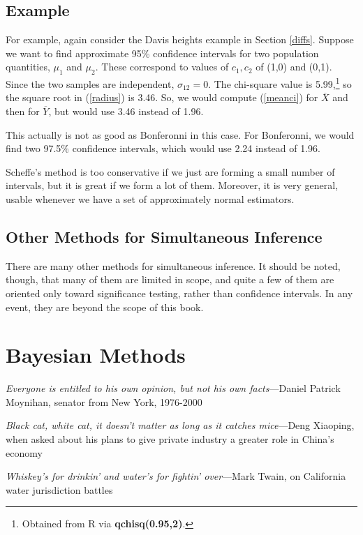 \subsection{Example}

For example, again consider the Davis heights example in Section
\ref{diffs}.  Suppose we want to find approximate 95\% confidence
intervals for two population quantities, $\mu_1$ and $\mu_2$.  These
correspond to values of $c_1,c_2$ of (1,0) and (0,1).  Since the two
samples are independent, $\sigma_{12} = 0$.  The chi-square value is
5.99,\footnote{Obtained from R via {\bf qchisq(0.95,2)}.} so the square
root in (\ref{radius}) is 3.46.  So, we would compute (\ref{meanci}) for
$\overline{X}$ and then for $\overline{Y}$, but would use 3.46 instead of 1.96.

This actually is not as good as Bonferonni in this case.  For
Bonferonni, we would find two 97.5\% confidence intervals, which would
use 2.24 instead of 1.96.


Scheffe's method is too conservative if we just are forming a small
number of intervals, but it is great if we form a lot of them.
Moreover, it is very general, usable whenever we have a set of
approximately normal estimators.

\subsection{Other Methods for Simultaneous Inference}

There are many other methods for simultaneous inference.  It should be
noted, though, that many of them are limited in scope, and quite a few
of them are oriented only toward significance testing, rather than
confidence intervals.  In any event, they are beyond the scope of this
book.

\section{Bayesian Methods}
\label{bayesian}

{\it Everyone is entitled to his own opinion, but not his own
facts}---Daniel Patrick Moynihan, senator from New York, 1976-2000

{\it Black cat, white cat, it doesn't matter as long as it catches
mice}---Deng Xiaoping, when asked about his plans to give private
industry a greater role in China's economy

{\em Whiskey's for drinkin' and water's for fightin' over}---Mark Twain,
on California water jurisdiction battles 

